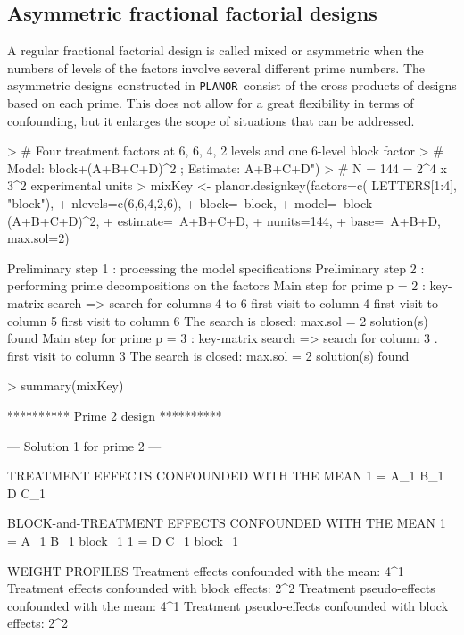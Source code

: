 \documentclass[a4paper]{article}
\newcommand{\PLANOR}{\texttt{PLANOR }}
\begin{document}
\subsection{Asymmetric fractional factorial designs}
A regular fractional factorial design is called mixed or asymmetric when the numbers
of levels of the factors involve several different prime numbers. The
asymmetric designs constructed in \PLANOR consist of the cross products of
designs based on each prime. This does not allow for a great flexibility
in terms of confounding, but it enlarges the scope of situations
that can be addressed. 

\begin{Schunk}
\begin{Sinput}
> # Four treatment factors at 6, 6, 4, 2 levels and one 6-level block factor
> # Model: block+(A+B+C+D)^2 ; Estimate: A+B+C+D\n")
> # N = 144 = 2^4 x 3^2 experimental units
> mixKey <- planor.designkey(factors=c( LETTERS[1:4], "block"), 
+                            nlevels=c(6,6,4,2,6), 
+                            block=~block,
+                            model=~block+(A+B+C+D)^2, 
+                            estimate=~A+B+C+D, 
+                            nunits=144,
+                        base=~A+B+D, max.sol=2)
\end{Sinput}
\begin{Soutput}
Preliminary step 1 : processing the model specifications
Preliminary step 2 : performing prime decompositions on the factors
Main step for prime p = 2 : key-matrix search
  => search for columns 4 to 6 
      first visit to column 4 
      first visit to column 5 
      first visit to column 6 
The search is closed: max.sol =  2 solution(s) found 
Main step for prime p = 3 : key-matrix search
  => search for column 3 .
      first visit to column 3 
The search is closed: max.sol =  2 solution(s) found 
\end{Soutput}
\begin{Sinput}
> summary(mixKey)
\end{Sinput}
\begin{Soutput}
********** Prime  2  design **********

--- Solution  1  for prime  2  ---

TREATMENT EFFECTS CONFOUNDED WITH THE MEAN
1 = A_1 B_1 D C_1

BLOCK-and-TREATMENT EFFECTS CONFOUNDED WITH THE MEAN
1 = A_1 B_1 block_1
1 = D C_1 block_1

WEIGHT PROFILES
Treatment effects confounded with the mean: 4^1 
Treatment effects confounded with block effects: 2^2 
Treatment pseudo-effects confounded with the mean: 4^1 
Treatment pseudo-effects confounded with block effects: 2^2 


\end{Soutput}
\end{Schunk}
\end{document}
